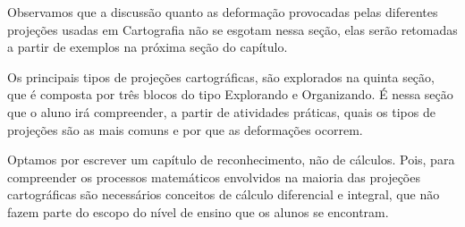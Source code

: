 \begin{apresentacao}
{Observamos que a discussão quanto as deformação provocadas pelas diferentes projeções usadas em Cartografia não se esgotam nessa seção, elas serão retomadas a partir de exemplos na próxima seção do capítulo.

Os principais tipos de projeções cartográficas, são explorados na quinta seção, que é composta por três blocos do tipo Explorando e Organizando. É nessa seção que o aluno irá compreender, a partir de atividades práticas, quais os tipos de projeções são as mais comuns e por que as deformações ocorrem.

Optamos por escrever um capítulo de reconhecimento, não de cálculos. Pois, para compreender os processos matemáticos envolvidos na maioria das projeções cartográficas são necessários conceitos de cálculo diferencial e integral, que não fazem parte do escopo do nível de ensino que os alunos se encontram.

}
\end{apresentacao}
\def\currentcolor{session1}
